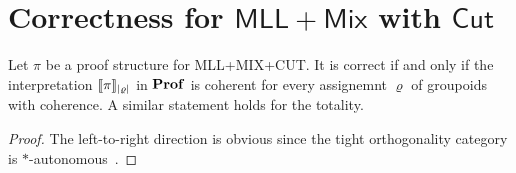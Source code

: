 \section{Correctness for $\mathsf{MLL+Mix}$ with $\mathsf{Cut}$}




\begin{theorem}
    Let \( \pi \) be a proof structure for \textsf{MLL+MIX+CUT}.
    It is correct if and only if the interpretation \( \llbracket{\pi}\rrbracket_{|\varrho|} \) in \( \mathbf{Prof} \) is coherent for every assignemnt \( \varrho \) of groupoids with coherence.
    A similar statement holds for the totality.
\end{theorem}
\begin{proof}
    The left-to-right direction is obvious since the tight orthogonality category is \( * \)-autonomous~\cite{Hyland2003}.
\end{proof}
